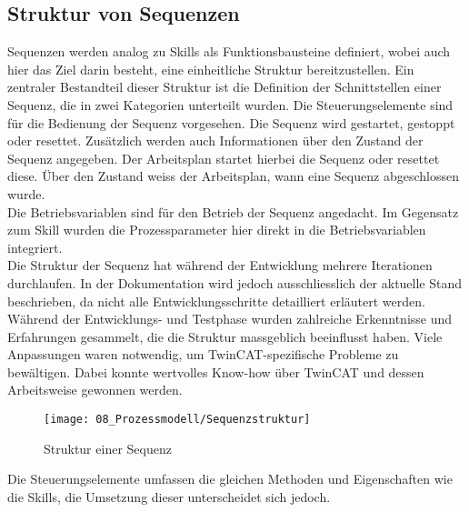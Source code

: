 	\subsection{Struktur von Sequenzen} \label{Sequenzstruktur}
		
		Sequenzen werden analog zu Skills als Funktionsbausteine definiert, wobei auch hier das Ziel darin besteht, eine einheitliche Struktur bereitzustellen. Ein zentraler Bestandteil dieser Struktur ist die Definition der Schnittstellen einer Sequenz, die in zwei Kategorien unterteilt wurden. Die Steuerungselemente sind für die Bedienung der Sequenz vorgesehen. Die Sequenz wird gestartet, gestoppt oder resettet. Zusätzlich werden auch Informationen über den Zustand der Sequenz angegeben.  Der Arbeitsplan startet hierbei die Sequenz oder resettet diese. Über den Zustand weiss der Arbeitsplan, wann eine Sequenz abgeschlossen wurde. 
		\\
		Die Betriebsvariablen sind für den Betrieb der Sequenz angedacht. Im Gegensatz zum Skill wurden die Prozessparameter hier direkt in die Betriebsvariablen integriert.
		\\
		Die Struktur der Sequenz hat während der Entwicklung mehrere Iterationen durchlaufen. In der Dokumentation wird jedoch ausschliesslich der aktuelle Stand beschrieben, da nicht alle Entwicklungsschritte detailliert erläutert werden. Während der Entwicklungs- und Testphase wurden zahlreiche Erkenntnisse und Erfahrungen gesammelt, die die Struktur massgeblich beeinflusst haben. Viele Anpassungen waren notwendig, um TwinCAT-spezifische Probleme zu bewältigen. Dabei konnte wertvolles Know-how über TwinCAT und dessen Arbeitsweise gewonnen werden.
		
		\newpage
		
		\begin{figure}[H]
			\centering
			\texttt{[image: 08\_Prozessmodell/Sequenzstruktur]}
			\captionsetup{justification=centering}
			\caption{Struktur einer Sequenz}
			\label{fig:Sequenzstruktur}
		\end{figure}
		
		Die Steuerungselemente umfassen die gleichen Methoden und Eigenschaften wie die Skills, die Umsetzung dieser unterscheidet sich jedoch. 
		
